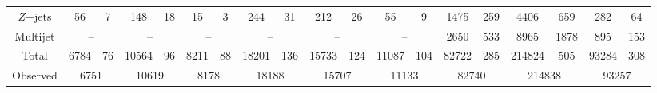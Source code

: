 \begin{table}[tbp]
\begin{center}
{\begin{tabular}{| c | c@{\ $\pm$\ }c c@{\ $\pm$\ }c c@{\ $\pm$\ }c | c@{\ $\pm$\ }c  c@{\ $\pm$\ }c c@{\ $\pm$\ }c | c@{\ $\pm$\ }c  c@{\ $\pm$\ }c c@{\ $\pm$\ }c |}
				$Z$+jets&                     56 &           7&                    148 &          18&                     15 &           3&                    244 &          31&                    212 &          26&                     55 &           9&                   1475 &         259&                   4406 &         659&                    282 &          64\\
				Multijet&\multicolumn{2}{c}{   --}             &\multicolumn{2}{c}{   --}             &\multicolumn{2}{c|}{   --}             &\multicolumn{2}{c}{   --}             &\multicolumn{2}{c}{   --}             &\multicolumn{2}{c|}{   --}             &                   2650 &         533&                   8965 &        1878&                    895 &         153\\
				\hline
				Total&                   6784 &          76&                  10564 &          96&                   8211 &          88&                  18201 &         136&                  15733 &         124&                  11087 &         104&                  82722 &         285&                 214824 &         505&                  93284 &         308\\
				\hline
				Observed&\multicolumn{2}{c}{6751}             &\multicolumn{2}{c}{10619}             &\multicolumn{2}{c|}{8178}             &\multicolumn{2}{c}{18188}             &\multicolumn{2}{c}{15707}             &\multicolumn{2}{c|}{11133}             &\multicolumn{2}{c}{82740}             &\multicolumn{2}{c}{214838}             &\multicolumn{2}{c|}{93257}             \\
				\hline
				\hline
			\end{tabular}
		}
		\label{tab:yields_WZ}
	\end{center}
\end{table}


